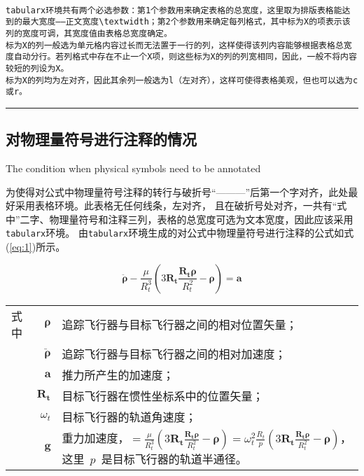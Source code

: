 \begin{lstlisting}

tabularx环境共有两个必选参数：第1个参数用来确定表格的总宽度，这里取为排版表格能达到的最大宽度——正文宽度\textwidth；第2个参数用来确定每列格式，其中标为X的项表示该列的宽度可调，其宽度值由表格总宽度确定。
标为X的列一般选为单元格内容过长而无法置于一行的列，这样使得该列内容能够根据表格总宽度自动分行。若列格式中存在不止一个X项，则这些标为X的列的列宽相同，因此，一般不将内容较短的列设为X。
标为X的列均为左对齐，因此其余列一般选为l（左对齐），这样可使得表格美观，但也可以选为c或r。

\end{lstlisting}

\noindent\hrule

\subsection{对物理量符号进行注释的情况}{The condition when physical symbols need to be annotated}

为使得对公式中物理量符号注释的转行与破折号“———”后第一个字对齐，此处最好采用表格环境。此表格无任何线条，左对齐，
且在破折号处对齐，一共有“式中”二字、物理量符号和注释三列，表格的总宽度可选为文本宽度，因此应该采用\verb|tabularx|环境。
由\verb|tabularx|环境生成的对公式中物理量符号进行注释的公式如式(\ref{eq:1})所示。

\begin{equation}\label{eq:1}
\ddot{\boldsymbol{\rho}}-\frac{\mu}{R_{t}^{3}}\left(3\mathbf{R_{t}}\frac{\mathbf{R_{t}\rho}}{R_{t}^{2}}-\boldsymbol{\rho}\right)=\mathbf{a}
\end{equation}
\begin{tabularx}{\textwidth}{@{}l@{\quad}r@{———}X@{}}
式中& $\boldsymbol{\rho}$ &追踪飞行器与目标飞行器之间的相对位置矢量；\\
&  $\boldsymbol{\ddot{\rho}}$&追踪飞行器与目标飞行器之间的相对加速度；\\
&  $\mathbf{a}$   &推力所产生的加速度；\\
&  $\mathbf{R_t}$ & 目标飞行器在惯性坐标系中的位置矢量；\\
&  $\omega_{t}$ & 目标飞行器的轨道角速度；\\
&  $\mathbf{g}$ & 重力加速度，$=\frac{\mu}{R_{t}^{3}}\left(
3\mathbf{R_{t}}\frac{\mathbf{R_{t}\rho}}{R_{t}^{2}}-\boldsymbol{\rho}\right)=\omega_{t}^{2}\frac{R_{t}}{p}\left(
3\mathbf{R_{t}}\frac{\mathbf{R_{t}\rho}}{R_{t}^{2}}-\boldsymbol{\rho}\right)$，这里~$p$~是目标飞行器的轨道半通径。
\end{tabularx}\vspace{\baselineskip}


